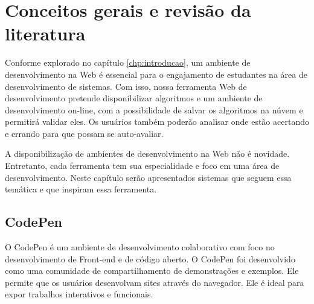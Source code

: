 \chapter{Conceitos gerais e revisão da literatura}
\label{chp:conceitos-gerais}
Conforme explorado no capítulo \ref{chp:introducao}, um ambiente de desenvolvimento na Web é essencial para o engajamento de estudantes na área de desenvolvimento de sistemas. Com isso, nossa ferramenta Web de desenvolvimento pretende disponibilizar algoritmos e um ambiente de desenvolvimento on-line, com a possibilidade de salvar os algoritmos na núvem e permitirá validar eles. Os usuários também poderão analisar onde estão acertando e errando para que possam se auto-avaliar.

A disponibilização de ambientes de desenvolvimento na Web não é novidade. Entretanto, cada ferramenta tem sua especialidade e foco em uma área de desenvolvimento. Neste capítulo serão apresentados sistemas que seguem essa temática e que inspiram essa ferramenta.

\section{CodePen}
\label{sec:codepen}
O CodePen é um ambiente de desenvolvimento colaborativo com foco no desenvolvimento de Front-end e de código aberto. O CodePen foi desenvolvido como uma comunidade de compartilhamento de demonstrações e exemplos. Ele permite que os usuários desenvolvam sites através do navegador. Ele é ideal para expor trabalhos interativos e funcionais\cite{fiala2016collaborative}.



